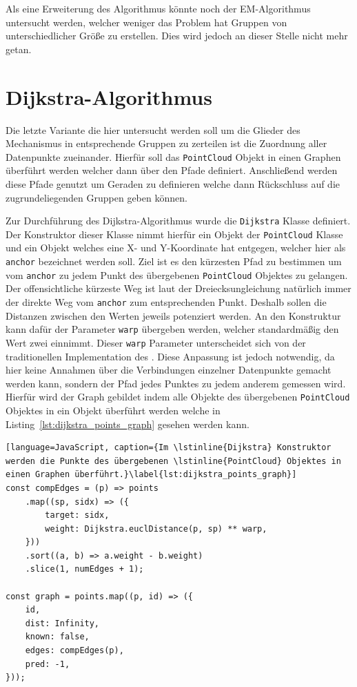 Als eine Erweiterung des  Algorithmus könnte noch der EM-Algorithmus untersucht werden, welcher weniger das Problem hat Gruppen von unterschiedlicher Größe zu erstellen.
Dies wird jedoch an dieser Stelle nicht mehr getan.

\section{Dijkstra-Algorithmus}

Die letzte Variante die hier untersucht werden soll um die Glieder des Mechanismus in entsprechende Gruppen zu zerteilen ist die Zuordnung aller Datenpunkte zueinander.
Hierfür soll das \lstinline{PointCloud} Objekt in einen Graphen überführt werden welcher dann über den  Pfade definiert.
Anschließend werden diese Pfade genutzt um Geraden zu definieren welche dann Rückschluss auf die zugrundeliegenden Gruppen geben können.

Zur Durchführung des Dijkstra-Algorithmus wurde die \lstinline{Dijkstra} Klasse definiert.
Der Konstruktor dieser Klasse nimmt hierfür ein Objekt der \lstinline{PointCloud} Klasse und ein Objekt welches eine X- und Y-Koordinate hat entgegen, welcher hier als \lstinline{anchor} bezeichnet werden soll.
Ziel ist es den kürzesten Pfad zu bestimmen um vom \lstinline{anchor} zu jedem Punkt des übergebenen \lstinline{PointCloud} Objektes zu gelangen.
Der offensichtliche kürzeste Weg ist laut der Dreiecksungleichung natürlich immer der direkte Weg vom \lstinline{anchor} zum entsprechenden Punkt.
Deshalb sollen die Distanzen zwischen den Werten jeweils potenziert werden.
An den Konstruktur kann dafür der Parameter \lstinline{warp} übergeben werden, welcher standardmäßig den Wert zwei einnimmt.
Dieser \lstinline{warp} Parameter unterscheidet sich von der traditionellen Implementation des .
Diese Anpassung ist jedoch notwendig, da hier keine Annahmen über die Verbindungen einzelner Datenpunkte gemacht werden kann, sondern der Pfad jedes Punktes zu jedem anderem gemessen wird.
Hierfür wird der Graph gebildet indem alle Objekte des übergebenen \lstinline{PointCloud} Objektes in ein Objekt überführt werden welche in Listing~\ref{lst:dijkstra_points_graph} gesehen werden kann.

\begin{lstlisting}[language=JavaScript, caption={Im \lstinline{Dijkstra} Konstruktor werden die Punkte des übergebenen \lstinline{PointCloud} Objektes in einen Graphen überführt.}\label{lst:dijkstra_points_graph}]
const compEdges = (p) => points
    .map((sp, sidx) => ({
        target: sidx,
        weight: Dijkstra.euclDistance(p, sp) ** warp,
    }))
    .sort((a, b) => a.weight - b.weight)
    .slice(1, numEdges + 1);

const graph = points.map((p, id) => ({
    id,
    dist: Infinity,
    known: false,
    edges: compEdges(p),
    pred: -1,
}));
\end{lstlisting}

